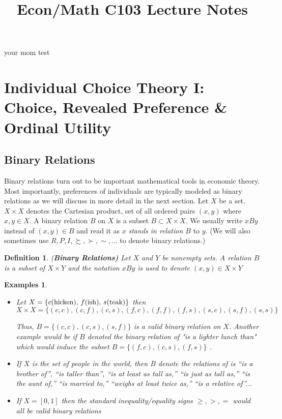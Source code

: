 \documentclass[12pt]{article}
\title{\textbf{Econ/Math C103 Lecture Notes}}
\author{}
\date{}
\newtheorem{defin}{Definition}
\newtheorem{unex}[ex]{Examples}
\newcommand{\tn}[1]{\textnormal{#1}}
\newcommand{\name}[1]{\tn{(\textbf{#1)}}}
\newcommand{\pref}{\succsim}
\newcommand{\spref}{\succ}
\newcommand{\3}{\vspace*{3mm}}
\begin{document}
\maketitle
\tableofcontents

your mom test 



\newpage

\section{Individual Choice Theory I: Choice, Revealed Preference \& Ordinal Utility}
\subsection{Binary Relations}

Binary relations turn out to be important mathematical tools in economic theory. Most importantly, preferences of individuals are typically modeled as binary relations as we will discuss in more detail in the next section. Let $X$ be a set. $X \times X$ denotes the Cartesian product, set of all ordered pairs $(x, y)$ where $x, y \in X$. A binary relation $B$ on $X$ is a subset $B \subset X \times X$. We usually write $xBy$ instead of $(x, y) \in B$ and read it as $x$ \emph{stands in relation $B$} to $y$. (We will also sometimes use $R, P , I, \pref, \spref, \sim,$... to denote binary relations.)

\begin{defin} 

\name{Binary Relations} \tn{Let $X$ and $Y$ be nonempty sets. A relation $B$ is a subset of $X \times Y$ and the notation $x B y$ is used to denote $(x,y) \in X \times Y $}

\end{defin}

\begin{unex}
\
\begin{itemize}
\item \tn{Let} $X = \{\tn{$c$(hicken), $f$(ish), $s$(teak)} \}$ \tn{then} 
\[ X \times X = \{(c,c), (c,f), (c,s), (f,c), (f,f), (f,s), (s,c), (s,f), (s,s)\}\]

\tn{Thus, $B = \{(c,c), (c,s), (s,f) \}$ is a valid binary relation on $X$. Another example would be if $B$ denoted the binary relation of "is a lighter lunch than" which would induce the subset $B = \{(f,c), (c,s), (f,s) \}$  }.

\item  \tn{If $X$ is the set of people in the world, then $B$ denote the relations of is “is a brother of”, “is taller than”, “is at
least as tall as,” “is just as tall as,” “is the aunt of,” “is married to,” “weighs at
least twice as,” “is a relative of”...}

\item \tn{If $X = [0,1]$ then the standard inequality/equality signs $\geq, >, =$ would all be valid binary relations}
\end{itemize}

\end{unex}
\end{document}
